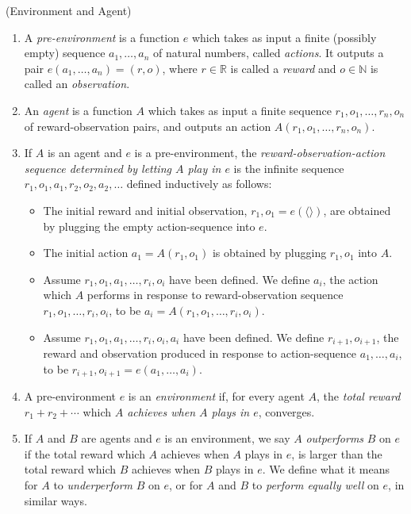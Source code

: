 \documentclass[twoside,11pt]{article}
\begin{document}
\begin{definition}
\label{EnvironmentAndAgent}
    (Environment and Agent)
    \begin{enumerate}
        \item
        A \emph{pre-environment} is a function $e$ which takes as input a finite
        (possibly empty) sequence
        $a_1,\ldots,a_n$ of
        natural numbers, called \emph{actions}. It outputs a pair 
        $e(a_1,\ldots,a_n)=(r,o)$, where $r\in\mathbb R$ is called a \emph{reward}
        and $o\in\mathbb N$ is called an \emph{observation}.
        \item
        An \emph{agent} is a function $A$ which takes as input a finite sequence
        $r_1,o_1,\ldots,r_n,o_n$ of reward-observation pairs, and outputs an action
        $A(r_1,o_1,\ldots,r_n,o_n)$.
        \item
        If $A$ is an agent and $e$ is a pre-environment,
        the \emph{reward-observation-action sequence
        determined by letting $A$ play in $e$} is the infinite sequence
        $r_1,o_1,a_1,r_2,o_2,a_2,\ldots$ defined inductively as follows:
        \begin{itemize}
            \item
            The initial reward and initial observation,
            $r_1,o_1=e(\langle\rangle)$, are obtained by plugging the empty
            action-sequence into $e$.
            \item
            The initial action
            $a_1=A(r_1,o_1)$ is obtained by plugging $r_1,o_1$ into $A$.
            \item
            Assume $r_1,o_1,a_1,\ldots,r_i,o_i$ have been defined.
            We define $a_i$,
            the action which $A$ performs
            in response to reward-observation sequence $r_1,o_1,\ldots,r_i,o_i$,
            to be $a_i=A(r_1,o_1,\ldots,r_i,o_i)$.
            \item
            Assume $r_1,o_1,a_1,\ldots,r_i,o_i,a_i$ have been defined.
            We define $r_{i+1},o_{i+1}$, the reward and observation
            produced in response to action-sequence $a_1,\ldots,a_i$,
            to be $r_{i+1},o_{i+1}=e(a_1,\ldots,a_i)$.
        \end{itemize}
        \item
        A pre-environment $e$ is an \emph{environment} if,
        for every agent $A$, the \emph{total reward} $r_1+r_2+\cdots$
        which \emph{$A$ achieves
        when $A$ plays in $e$}, converges.
        \item
        If $A$ and $B$ are agents and $e$ is an environment, we say $A$ \emph{outperforms}
        $B$ on $e$ if the total reward which $A$ achieves when $A$ plays in $e$, is larger than
        the total reward which $B$ achieves when $B$ plays in $e$. We define what it means for
        $A$ to \emph{underperform} $B$ on $e$, or for $A$ and $B$ to \emph{perform equally well}
        on $e$, in similar ways.
    \end{enumerate}
\end{definition}
\end{document}
